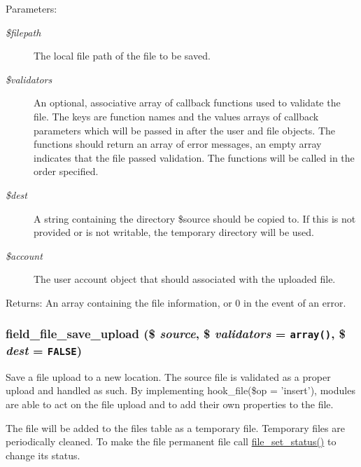 \begin{Desc}
\item[Parameters:]
\begin{description}
\item[{\em \$filepath}]The local file path of the file to be saved. \item[{\em \$validators}]An optional, associative array of callback functions used to validate the file. The keys are function names and the values arrays of callback parameters which will be passed in after the user and file objects. The functions should return an array of error messages, an empty array indicates that the file passed validation. The functions will be called in the order specified. \item[{\em \$dest}]A string containing the directory \$source should be copied to. If this is not provided or is not writable, the temporary directory will be used. \item[{\em \$account}]The user account object that should associated with the uploaded file. \end{description}
\end{Desc}
\begin{Desc}
\item[Returns:]An array containing the file information, or 0 in the event of an error. \end{Desc}
\hypertarget{field__file_8inc_3bd2944da87148acc1c84eecdb22df66}{
\subsubsection[{field\_\-file\_\-save\_\-upload}]{\setlength{\rightskip}{0pt plus 5cm}field\_\-file\_\-save\_\-upload (\$ {\em source}, \/  \$ {\em validators} = {\tt array()}, \/  \$ {\em dest} = {\tt FALSE})}}
\label{field__file_8inc_3bd2944da87148acc1c84eecdb22df66}


Save a file upload to a new location. The source file is validated as a proper upload and handled as such. By implementing hook\_\-file(\$op = 'insert'), modules are able to act on the file upload and to add their own properties to the file.

The file will be added to the files table as a temporary file. Temporary files are periodically cleaned. To make the file permanent file call \hyperlink{group__file_g68a0e6728e47cf2f9d543a0002ff3f49}{file\_\-set\_\-status()} to change its status.

